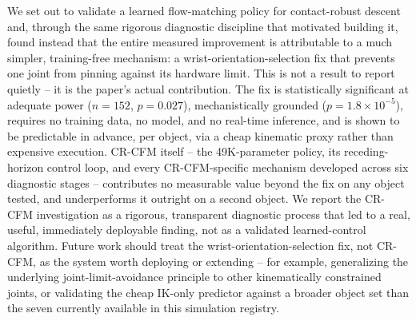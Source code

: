 \documentclass[]{interact}
\begin{document}
We set out to validate a learned flow-matching policy for contact-robust descent and, through the
same rigorous diagnostic discipline that motivated building it, found instead that the entire
measured improvement is attributable to a much simpler, training-free mechanism: a
wrist-orientation-selection fix that prevents one joint from pinning against its hardware limit.
This is not a result to report quietly -- it is the paper's actual contribution. The fix is
statistically significant at adequate power ($n=152$, $p=0.027$), mechanistically grounded
($p=1.8\times10^{-5}$), requires no training data, no model, and no real-time inference, and is
shown to be predictable in advance, per object, via a cheap kinematic proxy rather than expensive
execution. CR-CFM itself -- the 49K-parameter policy, its receding-horizon control loop, and every
CR-CFM-specific mechanism developed across six diagnostic stages -- contributes no measurable value
beyond the fix on any object tested, and underperforms it outright on a second object. We report the
CR-CFM investigation as a rigorous, transparent diagnostic process that led to a real, useful,
immediately deployable finding, not as a validated learned-control algorithm. Future work should
treat the wrist-orientation-selection fix, not CR-CFM, as the system worth deploying or extending --
for example, generalizing the underlying joint-limit-avoidance principle to other kinematically
constrained joints, or validating the cheap IK-only predictor against a broader object set than the
seven currently available in this simulation registry.
\end{document}
